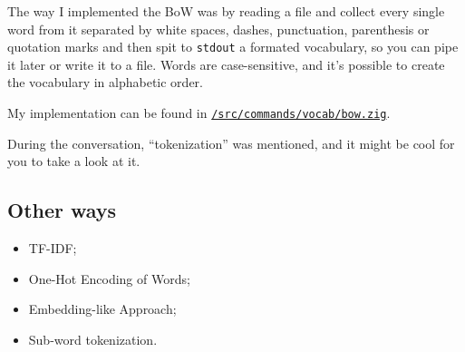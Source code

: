 \documentclass[a4paper,12pt]{article}
\theoremstyle{mytheoremstyle}
\theoremstyle{mytheoremstyle}
\theoremstyle{myproblemstyle}
\begin{document}
    The way I implemented the BoW was by reading a file and collect every
    single word from it separated by white spaces, dashes, punctuation,
    parenthesis or quotation marks and then spit to \texttt{stdout} a formated
    vocabulary, so you can pipe it later or write it to a file. Words are
    case-sensitive, and it's possible to create the vocabulary in alphabetic
    order.

    My implementation can be found in \href{run:../src/commands/vocab/bow.zig}{\texttt{/src/commands/vocab/bow.zig}}.

    During the conversation, ``tokenization'' was mentioned, and it might be
    cool for you to take a look at it.

    \subsection{Other ways}

    \begin{itemize}
        \item TF-IDF;
        \item One-Hot Encoding of Words;
        \item Embedding-like Approach;
        \item Sub-word tokenization.
    \end{itemize}

    \medskip

    \printbibliography[
    heading=bibintoc
    ]
\end{document}
